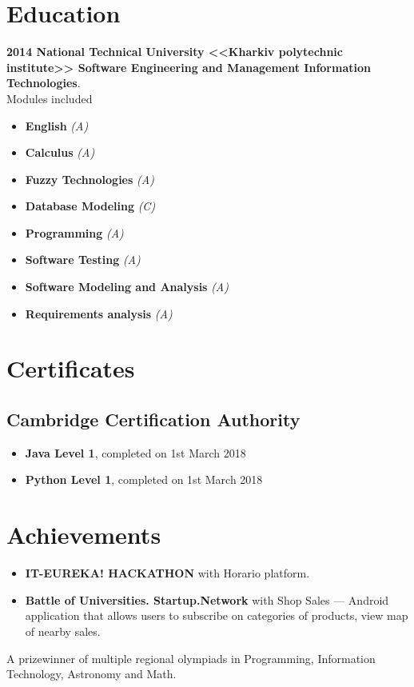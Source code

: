 \documentclass[a4paper]{article}
\begin{document}
	\section*{Education}
	\textbf{2014 National Technical University <<Kharkiv polytechnic institute>> Software Engineering and Management Information Technologies}. \\
	Modules included 
	\begin{multicols}{2}
	\begin{itemize}
		\item \textbf{English} \textit{(A)}
		\item \textbf{Calculus} \textit{(A)}
		\item \textbf{Fuzzy Technologies} \textit{(A)}
		\item \textbf{Database Modeling} \textit{(C)}
		\item \textbf{Programming} \textit{(A)}
		\item \textbf{Software Testing} \textit{(A)}
		\item \textbf{Software Modeling and Analysis} \textit{(A)}
		\item \textbf{Requirements analysis} \textit{(A)}
	\end{itemize}
	\end{multicols}
	
	\section*{Certificates}
	\subsection*{Cambridge Certification Authority}
	\begin{itemize}
		\item \textbf{Java Level 1}, completed on 1st March 2018
		\item \textbf{Python Level 1}, completed on 1st March 2018
	\end{itemize}

	\section*{Achievements}
	\begin{itemize}
		\item \textbf{IT-EUREKA! HACKATHON} with Horario platform.
		\item \textbf{Battle of Universities. Startup.Network} with Shop Sales --- Android application that allows users to subscribe on categories of products, view map of nearby sales.
	\end{itemize}
	A prizewinner of multiple regional olympiads in Programming, Information Technology, Astronomy and Math. 
\end{document}
